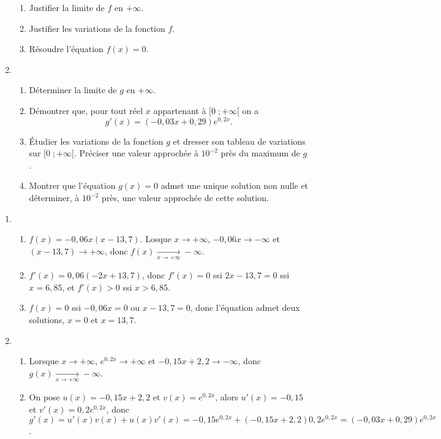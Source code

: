 \documentclass[a4paper,12pt]{exam}
\begin{document}
\begin{questions}
\begin{enumerate}
\begin{enumerate}
 \item Justifier la limite de $f$ en $+\infty$.
 \item Justifier les variations de la fonction $f$.
\item Résoudre l'équation $f(x)=0$.
\end{enumerate}
\item\ 
\begin{enumerate}
\item Déterminer la limite de $g$ en $+\infty$.
\item Démontrer que, pour tout réel $x$ appartenant à $[0\;;+\infty[$ on a $$g'(x)=(-0{,}03x+0{,}29)e^{0{,}2x}.$$
\item Étudier les variations de la fonction $g$ et dresser son tableau de variations sur $[0\;;+\infty[$. Préciser une valeur approchée à $10^{-2}$ près du maximum de $g$.
\item Montrer que l'équation $g(x)=0$ admet une unique solution non nulle et déterminer, à
$10^{-2}$ près, une valeur approchée de cette solution.
\end{enumerate}
\end{enumerate}
\begin{solution}
 \begin{enumerate}
 \item\ 
\begin{enumerate}
 \item $f(x)=-0{,}06x(x-13{,}7)$. Losque $x\rightarrow+\infty$, $-0{,}06x\rightarrow -\infty$ et $(x-13{,}7)\rightarrow+\infty$, donc $f(x)\xrightarrow[x\rightarrow+\infty]{}-\infty$.
 \item $f'(x)=0{,}06(-2x+13{,}7)$, donc $f'(x)=0$ ssi $2x-13{,}7=0$ ssi $x=6{,}85$, et $f'(x)>0$ ssi $x>6{,}85$.
\item $f(x)=0$ ssi $-0{,}06x=0$ ou $x-13{,}7=0$, donc l'équation admet deux solutions, $x=0$ et $x=13{,}7$.
\end{enumerate}
\item\ 
\begin{enumerate}
\item Lorsque $x\rightarrow+\infty$, $e^{0{,}2x}\rightarrow+\infty$ et $-0{,}15x+2{,}2\rightarrow-\infty$, donc $g(x)\xrightarrow[x\rightarrow+\infty]{}-\infty$.
\item On pose $u(x)=-0{,}15x+2{,}2$ et $v(x)=e^{0{,}2x}$, alors $u'(x)=-0{,}15$ et $v'(x)=0{,}2e^{0{,}2x}$, donc $g'(x)=u'(x)v(x)+u(x)v'(x)=-0{,}15e^{0{,}2x}+(-0{,}15x+2{,}2)0{,}2e^{0{,}2x}=(-0{,}03x+0{,}29)e^{0{,}2x}$.

\end{enumerate}
\end{enumerate}
\end{solution}
\end{questions}
\end{document}
